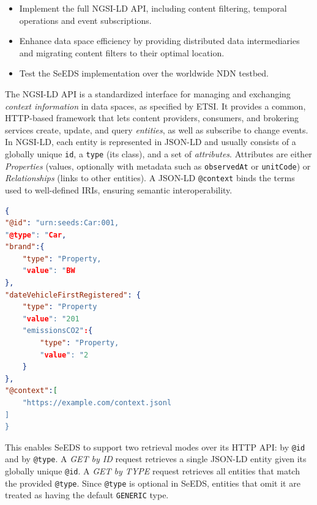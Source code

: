 \documentclass{article}
\begin{document}
\begin{itemize}
    \item Implement the full NGSI-LD API, including content filtering, temporal operations and event subscriptions.  
    \item Enhance data space efficiency by providing distributed data intermediaries and migrating content filters to their optimal location.
    \item Test the SeEDS implementation over the worldwide NDN testbed. 
\end{itemize}

The NGSI-LD API is a standardized interface for managing and exchanging
\emph{context information} in data spaces, as specified by ETSI. It provides a
common, HTTP-based framework that lets content providers, consumers, and
brokering services create, update, and query \emph{entities}, as well as
subscribe to change events. In NGSI-LD, each entity is represented in JSON-LD
and usually consists of a globally unique \texttt{id}, a \texttt{type} (its class),
and a set of \emph{attributes}. Attributes are either \emph{Properties} (values,
optionally with metadata such as \texttt{observedAt} or \texttt{unitCode}) or
\emph{Relationships} (links to other entities). A JSON-LD \texttt{@context}
binds the terms used to well-defined IRIs, ensuring semantic interoperability.

\begin{lstlisting}[language=json, caption={Example JSON-LD},label={lst:ngsi-ld-json}]
{ 
"@id": "urn:seeds:Car:001,
"@type": "Car,
"brand":{
    "type": "Property,
    "value": "BW
},
"dateVehicleFirstRegistered": { 
    "type": "Property
    "value": "201
    "emissionsCO2":{
        "type": "Property,
        "value": "2
    }
},
"@context":[
    "https://example.com/context.jsonl
] 
} 
\end{lstlisting}

This enables SeEDS to support two retrieval modes over its HTTP API: by \texttt{@id} and by \texttt{@type}.
A \emph{GET by ID} request retrieves a single JSON-LD entity given its globally
unique \texttt{@id}. A \emph{GET by TYPE} request retrieves all entities that
match the provided \texttt{@type}. Since \texttt{@type} is optional in SeEDS,
entities that omit it are treated as having the default \texttt{GENERIC} type.
\end{document}
